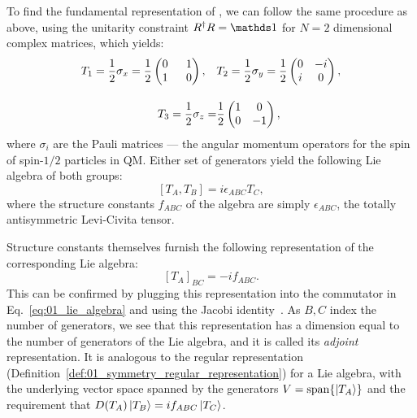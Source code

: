To find the fundamental representation of \su[2], we can follow the same procedure as above, using the unitarity constraint $R^\dagger R = \identity$ for $N = 2$ dimensional complex matrices, which yields:
\begin{equation} 
	\label{eq:01_su2_generators}
	\begin{split}
	\setlength{\arraycolsep}{8pt}
	T_1 = \frac{1}{2}\sigma_x = \frac{1}{2}\begin{pmatrix}
		0 & 1 \\
		1 & 0
	\end{pmatrix}, \quad
	&T_2 = \frac{1}{2}\sigma_y = \frac{1}{2}\begin{pmatrix}
		0 & -i \\
		i & 0
	\end{pmatrix}, \\[1em]
	T_3 = \frac{1}{2}\sigma_z = &\frac{1}{2}\begin{pmatrix}
		1 & 0 \\
		0 & -1
	\end{pmatrix},
\end{split} 
\end{equation}
where $\sigma_i$ are the Pauli matrices --- the angular momentum operators for the spin of spin-$1/2$ particles in QM.
Either set of generators yield the following Lie algebra of both groups:
\begin{equation}
	\label{eq:01_so3_su2_lie_algebra}
	[T_A, T_B] = i \epsilon_{ABC} T_C,
\end{equation}
where the structure constants $f_{ABC}$ of the algebra are simply $\epsilon_{ABC}$, the totally antisymmetric Levi-Civita tensor.

Structure constants themselves furnish the following representation of the corresponding Lie algebra:
\begin{equation}
	\label{eq:01_adjoint}
	[T_A]_{BC} = -i f_{ABC}.
\end{equation}
This can be confirmed by plugging this representation into the commutator in Eq.~\ref{eq:01_lie_algebra} and using the Jacobi identity~\cite{Jacobi1862}.
As $B, C$ index the number of generators, we see that this representation has a dimension equal to the number of generators of the Lie algebra, and it is called its \textit{adjoint} representation.
It is analogous to the regular representation (Definition~\ref{def:01_symmetry_regular_representation}) for a Lie algebra, with the underlying vector space spanned by the generators $V = \mathrm{span}\{\ket{T_A}\}$ and the requirement that $D(T_A)\ket{T_B} = i f_{ABC} \ket{T_C}$.

